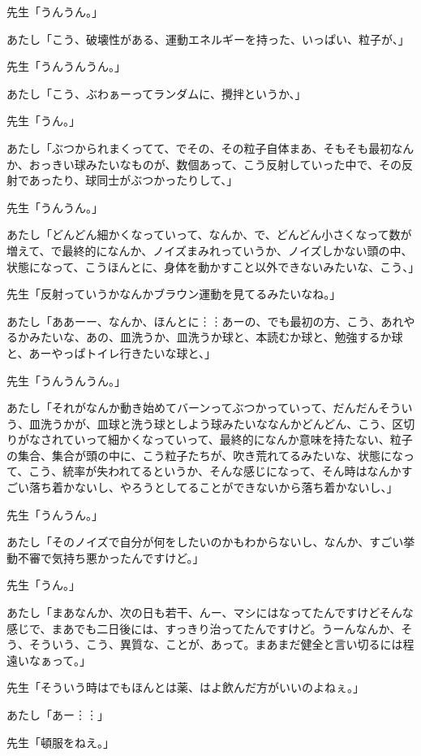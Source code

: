 \documentclass[b5j,twoside,twocolumn]{utarticle}
\begin{document}
\begin{description}
\item 先生「うんうん。」
\item あたし「こう、破壊性がある、運動エネルギーを持った、いっぱい、粒子が、」
\item 先生「うんうんうん。」
\item あたし「こう、ぶわぁーってランダムに、攪拌というか、」
\item 先生「うん。」
\item あたし「ぶつかられまくってて、でその、その粒子自体まあ、そもそも最初なんか、おっきい球みたいなものが、数個あって、こう反射していった中で、その反射であったり、球同士がぶつかったりして、」
\item 先生「うんうん。」
\item あたし「どんどん細かくなっていって、なんか、で、どんどん小さくなって数が増えて、で最終的になんか、ノイズまみれっていうか、ノイズしかない頭の中、状態になって、こうほんとに、身体を動かすこと以外できないみたいな、こう、」
\item 先生「反射っていうかなんかブラウン運動を見てるみたいなね。」
\item あたし「ああーー、なんか、ほんとに︙︙あーの、でも最初の方、こう、あれやるかみたいな、あの、皿洗うか、皿洗うか球と、本読むか球と、勉強するか球と、あーやっぱトイレ行きたいな球と、」
\item 先生「うんうんうん。」
\item あたし「それがなんか動き始めてバーンってぶつかっていって、だんだんそういう、皿洗うかが、皿球と洗う球としよう球みたいななんかどんどん、こう、区切りがなされていって細かくなっていって、最終的になんか意味を持たない、粒子の集合、集合が頭の中に、こう粒子たちが、吹き荒れてるみたいな、状態になって、こう、統率が失われてるというか、そんな感じになって、そん時はなんかすごい落ち着かないし、やろうとしてることができないから落ち着かないし、」
\item 先生「うんうん。」
\item あたし「そのノイズで自分が何をしたいのかもわからないし、なんか、すごい挙動不審で気持ち悪かったんですけど。」
\item 先生「うん。」
\item あたし「まあなんか、次の日も若干、んー、マシにはなってたんですけどそんな感じで、まあでも二日後には、すっきり治ってたんですけど。うーんなんか、そう、そういう、こう、異質な、ことが、あって。まあまだ健全と言い切るには程遠いなぁって。」
\item 先生「そういう時はでもほんとは薬、はよ飲んだ方がいいのよねぇ。」
\item あたし「あー︙︙」
\item 先生「頓服をねえ。」

\end{description}
\end{document}
